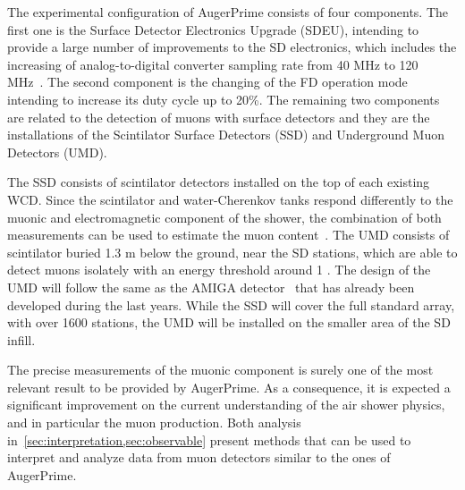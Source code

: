 The experimental configuration of AugerPrime consists of four components.
The first one is the Surface Detector Electronics Upgrade (SDEU), intending to provide
a large number of improvements to the SD electronics, which includes the increasing of
analog-to-digital converter sampling rate from 40 MHz to 120 MHz~\cite{Suomijarvi:2017ixb}.
The second component is the changing
of the FD operation mode intending to increase its duty cycle up to 20\%.
The remaining two components are related to the detection of muons with surface detectors and
they are the installations of the Scintilator Surface Detectors (SSD) and
Underground Muon Detectors (UMD).

The SSD consists of scintilator detectors installed on the top of each existing WCD.
Since the scintilator and water-Cherenkov tanks respond differently to the muonic and
electromagnetic component of the shower, the combination of both measurements
can be used to estimate the muon content~\cite{Gonzalez:2016ora}. 
The UMD consists of scintilator buried 1.3 m below the ground, near the SD stations,
which are able to detect muons isolately with an energy threshold around 1 \GeV. The design
of the UMD will follow the same as the AMIGA detector~\cite{Suarez:2013ecb,Wundheiler:2011zz,Platino:2011zz}
that has already been developed during the last years. While the SSD will cover the full
standard array, with over 1600 stations, the UMD will be installed on the smaller area
of the SD infill.

The precise measurements of the muonic component is surely one of the most relevant
result to be provided by AugerPrime. As a consequence, it is expected a significant
improvement on the current understanding of the air shower physics, and in particular
the muon production. Both analysis in~\cref{sec:interpretation,sec:observable}
present methods that can be used to interpret and analyze data from
muon detectors similar to the ones of AugerPrime.


